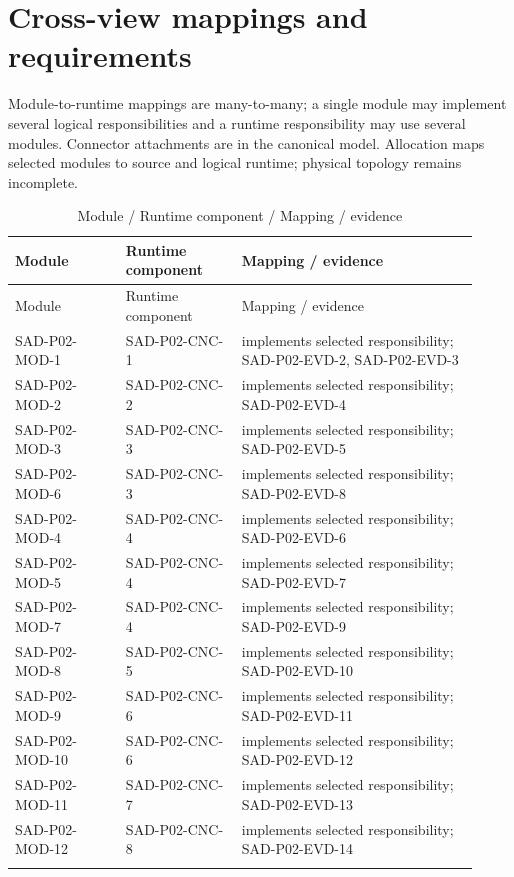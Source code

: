 \documentclass[10pt,letterpaper]{article}
\begin{document}
\section{Cross-view mappings and requirements}
Module-to-runtime mappings are many-to-many; a single module may implement several logical responsibilities and a runtime responsibility may use several modules. Connector attachments are in the canonical model. Allocation maps selected modules to source and logical runtime; physical topology remains incomplete.
\begin{longtable}{@{}>{\raggedright\arraybackslash}p{0.22\linewidth}>{\raggedright\arraybackslash}p{0.23\linewidth}>{\raggedright\arraybackslash}p{0.47\linewidth}@{}}
\caption{Module / Runtime component / Mapping / evidence}\\
\toprule Module & Runtime component & Mapping / evidence\\\midrule\endfirsthead
\toprule Module & Runtime component & Mapping / evidence\\\midrule\endhead
SAD-P02-MOD-1 & SAD-P02-CNC-1 & implements selected responsibility; SAD-P02-EVD-2, SAD-P02-EVD-3\\\addlinespace
SAD-P02-MOD-2 & SAD-P02-CNC-2 & implements selected responsibility; SAD-P02-EVD-4\\\addlinespace
SAD-P02-MOD-3 & SAD-P02-CNC-3 & implements selected responsibility; SAD-P02-EVD-5\\\addlinespace
SAD-P02-MOD-6 & SAD-P02-CNC-3 & implements selected responsibility; SAD-P02-EVD-8\\\addlinespace
SAD-P02-MOD-4 & SAD-P02-CNC-4 & implements selected responsibility; SAD-P02-EVD-6\\\addlinespace
SAD-P02-MOD-5 & SAD-P02-CNC-4 & implements selected responsibility; SAD-P02-EVD-7\\\addlinespace
SAD-P02-MOD-7 & SAD-P02-CNC-4 & implements selected responsibility; SAD-P02-EVD-9\\\addlinespace
SAD-P02-MOD-8 & SAD-P02-CNC-5 & implements selected responsibility; SAD-P02-EVD-10\\\addlinespace
SAD-P02-MOD-9 & SAD-P02-CNC-6 & implements selected responsibility; SAD-P02-EVD-11\\\addlinespace
SAD-P02-MOD-10 & SAD-P02-CNC-6 & implements selected responsibility; SAD-P02-EVD-12\\\addlinespace
SAD-P02-MOD-11 & SAD-P02-CNC-7 & implements selected responsibility; SAD-P02-EVD-13\\\addlinespace
SAD-P02-MOD-12 & SAD-P02-CNC-8 & implements selected responsibility; SAD-P02-EVD-14\\\addlinespace

\end{longtable}
\end{document}
